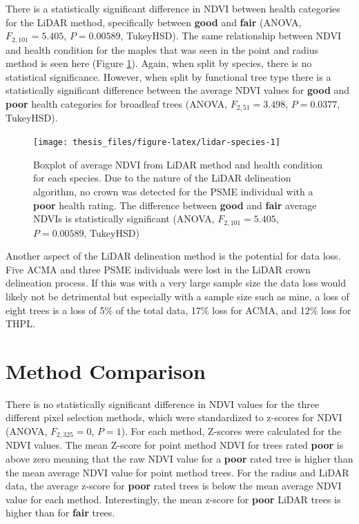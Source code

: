 \documentclass[12pt,twoside]{reedthesis}
\begin{document}
There is a statistically significant difference in NDVI between health
categories for the LiDAR method, specifically between \textbf{good} and
\textbf{fair} (ANOVA, \(F_{2,101} = 5.405\), \(P = 0.00589\), TukeyHSD). The same
relationship between NDVI and health condition for the maples that was
seen in the point and radius method is seen here (Figure
\ref{fig:lidar-species}). Again, when split by species, there is no
statistical significance. However, when split by functional tree type
there is a statistically significant difference between the average NDVI
values for \textbf{good} and \textbf{poor} health categories for broadleaf trees
(ANOVA, \(F_{2,51} = 3.498\), \(P = 0.0377\), TukeyHSD).







\begin{figure}

{\centering \texttt{[image: thesis\_files/figure-latex/lidar-species-1]} 

}

\caption[NDVI and health condition for LiDAR method]{Boxplot of average NDVI from LiDAR method and health
condition for each species. Due to the nature of the LiDAR delineation
algorithm, no crown was detected for the PSME individual with a \textbf{poor}
health rating. The difference between \textbf{good} and \textbf{fair} average
NDVIs is statistically significant (ANOVA, \(F_{2,101} = 5.405\),
\(P = 0.00589\), TukeyHSD)}\label{fig:lidar-species}
\end{figure}
Another aspect of the LiDAR delineation method is the potential for data
loss. Five ACMA and three PSME individuals were lost in the LiDAR crown
delineation process. If this was with a very large sample size the data
loss would likely not be detrimental but especially with a sample size
such as mine, a loss of eight trees is a loss of 5\% of the total data,
17\% loss for ACMA, and 12\% loss for THPL.

\hypertarget{method-comparison}{%
\section{Method Comparison}\label{method-comparison}}

There is no statistically significant difference in NDVI values for the
three different pixel selection methods, which were standardized to
z-scores for NDVI (ANOVA, \(F_{2, 325}=0\), \(P = 1\)). For each method,
Z-scores were calculated for the NDVI values. The mean Z-score for point
method NDVI for trees rated \textbf{poor} is above zero meaning that the raw
NDVI value for a \textbf{poor} rated tree is higher than the mean average
NDVI value for point method trees. For the radius and LiDAR data, the
average z-score for \textbf{poor} rated trees is below the mean average NDVI
value for each method. Interestingly, the mean z-score for \textbf{poor}
LiDAR trees is higher than for \textbf{fair} trees.
\end{document}
